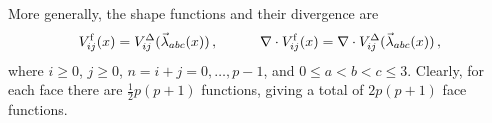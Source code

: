 More generally, the shape functions and their divergence are
\begin{equation}
	V_{ij}^\mathrm{f}(x)=V_{ij}^\Delta(\vec{\lambda}_{abc}(x))\,,\qquad\quad
		\nabla\cdot V_{ij}^\mathrm{f}(x)=\nabla \cdot V_{ij}^\Delta(\vec{\lambda}_{abc}(x))\,,
\end{equation}
where $i\geq0$, $j\geq0$, $n=i+j=0,\ldots,p-1$, and $0\leq a<b<c\leq3$. 
Clearly, for each face there are $\frac{1}{2}p(p+1)$ functions, giving a total of $2p(p+1)$ face functions.
%
%

